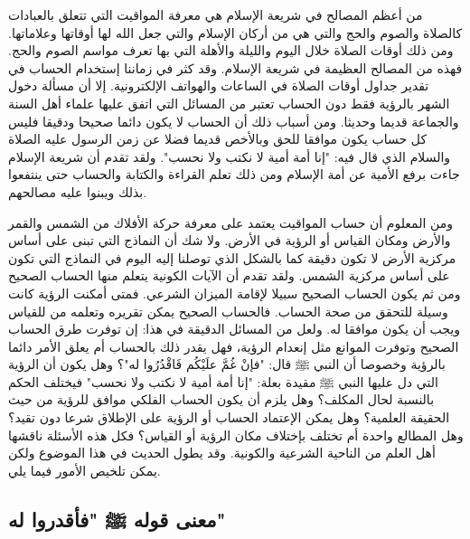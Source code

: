 من أعظم المصالح في شريعة الإسلام هي معرفة المواقيت التي تتعلق بالعبادات كالصلاة والصوم والحج والتي هي من أركان الإسلام والتي جعل الله لها أوقاتها وعلاماتها. ومن ذلك أوقات الصلاة خلال اليوم والليلة والأهلة التي بها تعرف مواسم الصوم والحج. فهذه من المصالح العظيمة في شريعة الإسلام. وقد كثر في زماننا إستخدام الحساب في تقدير جداول أوقات الصلاة في الساعات والهواتف الإلكترونية. إلا أن مسألة دخول الشهر بالرؤية فقط دون الحساب تعتبر من المسائل التي اتفق عليها علماء أهل السنة والجماعة قديما وحديثا. ومن أسباب ذلك أن الحساب لا يكون دائما صحيحا ودقيقا فليس كل حساب يكون موافقا للحق وبالأخص قديما فضلا عن زمن الرسول عليه الصلاة والسلام الذي قال فيه: "إنا أمة أمية لا نكتب ولا نحسب". ولقد تقدم أن شريعة الإسلام جاءت برفع الأمية عن أمة الإسلام ومن ذلك تعلم القراءة والكتابة والحساب حتى ينتفعوا بذلك ويبنوا عليه مصالحهم.

ومن المعلوم أن حساب المواقيت يعتمد على معرفة حركة الأفلاك من الشمس والقمر والأرض ومكان القياس أو الرؤية في الأرض. ولا شك أن النماذج التي تبنى على أساس مركزية الأرض لا تكون دقيقة كما بالشكل الذي توصلنا إليه اليوم في النماذج التي تكون على أساس مركزية الشمس. ولقد تقدم أن الآيات الكونية يتعلم منها الحساب الصحيح ومن ثم يكون الحساب الصحيح سبيلا لإقامة الميزان الشرعي. فمتى أمكنت الرؤية كانت وسيلة للتحقق من صحة الحساب. فالحساب الصحيح يمكن تقريره وتعلمه من للقياس ويجب أن يكون موافقا له. ولعل من المسائل الدقيقة في هذا: إن توفرت طرق الحساب الصحيح وتوفرت الموانع مثل إنعدام الرؤية، فهل يقدر ذلك بالحساب أم يعلق الأمر دائما بالرؤية وخصوصا أن النبي ﷺ قال: "فإنْ غُمَّ علَيْكُم فَاقْدُرُوا له"؟ وهل يكون أن الرؤية التي دل عليها النبي ﷺ مقيدة بعلة: "إنا أمة أمية لا نكتب ولا نحسب" فيختلف الحكم بالنسبة لحال المكلف؟ وهل يلزم أن يكون الحساب الفلكي موافق للرؤية من حيث الحقيقة العلمية؟ وهل يمكن الإعتماد الحساب أو الرؤية على الإطلاق شرعا دون تقيد؟ وهل المطالع واحدة أم تختلف بإختلاف مكان الرؤية أو القياس؟ فكل هذه الأسئلة ناقشها أهل العلم من الناحية الشرعية والكونية. وقد يطول الحديث في هذا الموضوع ولكن يمكن تلخيص الأمور فيما يلي.

\subsection{معنى قوله ﷺ "فأقدروا له"}

